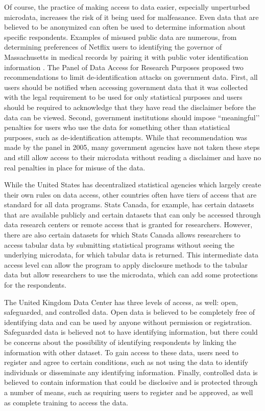 Of course, the practice of making access to data easier, especially unperturbed microdata, increases the risk of it being used for malfeasance. Even data that are believed to be anonymized can often be used to determine information about specific respondents. Examples of misused public data are numerous, from determining preferences of Netflix users  to identifying the governor of Massachusetts in medical records by pairing it with public voter identification information . The Panel of Data Access for Research Purposes proposed two recommendations to limit de-identification attacks on government data. First, all users should be notified when accessing government data that it was collected with the legal requirement to be used for only statistical purposes and users should be required to acknowledge that they have read the disclaimer before the data can be viewed. Second, government institutions should impose ``meaningful’’ penalties for users who use the data for something other than statistical purposes, such as de-identification attempts. While that recommendation was made by the panel in 2005, many government agencies have not taken these steps and still allow access to their microdata without reading a disclaimer and have no real penalties in place for misuse of the data.

While the United States has decentralized statistical agencies which largely create their own rules on data access, other countries often have tiers of access that are standard for all data programs. Stats Canada, for example, has certain datasets that are available publicly and certain datasets that can only be accessed through data research centers or remote access that is granted for researchers. However, there are also certain datasets for which Stats Canada allows researchers to access tabular data by submitting statistical programs without seeing the underlying microdata, for which tabular data is returned. This intermediate data access level can allow the program to apply disclosure methods to the tabular data but allow researchers to use the microdata, which can add some protections for the respondents.

The United Kingdom Data Center has three levels of access, as well: open, safeguarded, and controlled data. Open data is believed to be completely free of identifying data and can be used by anyone without permission or registration. Safeguarded data is believed not to have identifying information, but there could be concerns about the possibility of identifying respondents by linking the information with other dataset. To gain access to these data, users need to register and agree to certain conditions, such as not using the data to identify individuals or disseminate any identifying information. Finally, controlled data is believed to contain information that could be disclosive and is protected through a number of means, such as requiring users to register and be approved, as well as complete training to access the data.

